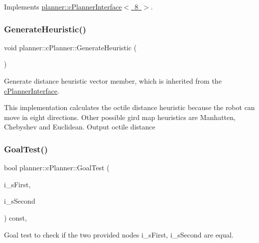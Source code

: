 Implements \mbox{\hyperlink{classplanner_1_1c_planner_interface}{planner\+::c\+Planner\+Interface$<$ 8 $>$}}.

\mbox{\label{classplanner_1_1c_planner_a1a4650050656545744796296a653d388}} 
\subsubsection{\texorpdfstring{Generate\+Heuristic()}{GenerateHeuristic()}}
{\footnotesize\ttfamily void planner\+::c\+Planner\+::\+Generate\+Heuristic (\begin{DoxyParamCaption}{ }\end{DoxyParamCaption})}



Generate distance heuristic vector member, which is inherited from the \mbox{\hyperlink{classplanner_1_1c_planner_interface}{c\+Planner\+Interface}}. 

This implementation calculates the octile distance heuristic because the robot can move in eight directions. Other possible gird map heuristics are Manhatten, Chebyshev and Euclidean. Output octile distance \mbox{\label{classplanner_1_1c_planner_a8b241ebd7bb3bde3dd062c50a2a42339}} 
\subsubsection{\texorpdfstring{Goal\+Test()}{GoalTest()}}
{\footnotesize\ttfamily bool planner\+::c\+Planner\+::\+Goal\+Test (\begin{DoxyParamCaption}\item[{const \mbox{\hyperlink{structplanner_1_1t_node}{t\+Node}} $\ast$}]{i\+\_\+s\+First,  }\item[{const \mbox{\hyperlink{structplanner_1_1t_node}{t\+Node}} $\ast$}]{i\+\_\+s\+Second }\end{DoxyParamCaption}) const\hspace{0.3cm}{\ttfamily [override]}, {\ttfamily [virtual]}}



Goal test to check if the two provided nodes i\+\_\+s\+First, i\+\_\+s\+Second are equal. 

